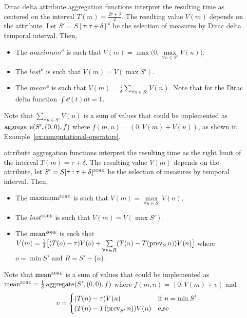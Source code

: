 Dirac delta attribute aggregation functions interpret the resulting
time as centered on the interval $T(m)=\frac{2\tau+\delta}{2}$. The
resulting value $V(m)$ depends on the attribute. Let
$S'=S[\tau:\tau+\delta]^\dd$ be the selection of measures by Dirac
delta temporal interval. Then,
\begin{itemize}
\item The $maximum^\dd$ is such that $V(m) =
  \max\big(0,\max\limits_{\forall n \in S'} V(n)\big)$.
\item The $last^\dd$ is such that $V(m) = V(\max S')$.
\item The $mean^\dd$ is such that $V(m) = \frac{1}{\delta}
  \sum\limits_{\forall n \in S'} V(n)$. Note that for the Dirac
  delta function $\int\dd(t)dt=1$.
\end{itemize}

Note that $\sum\limits_{\forall n \in S'} V(n)$ is a sum of values
that could be implemented as $\operatorname*{aggregate}(S',(0,0),f)$ where
$f(m,n)=(0,V(m)+V(n))$, as shown in
Example~\ref{ex:computational-operators}.

\zohe{} attribute aggregation functions interpret the resulting time
as the right limit of the interval $T(m)=\tau+\delta$. The resulting
value $V(m)$ depends on the attribute, let
$S'=S[\tau:\tau+\delta]^\zohe{}$ be the selection of measures by
\zohe{} temporal interval. Then,

\begin{itemize}

\item The $\maxz$ is such that $V(m) = \max\limits_{\forall n \in S'}
  V(n)$.

\item The $last^\zohe{}$ is such that $V(m) = V(\max S')$.

\item The $\meanz$ is such that $V(m) = \frac{1}{\delta}
  \big[(T(o)-\tau)V(o) + \sum\limits_{\forall n\in R}( T(n)-
  T(\operatorname*{prev}_S n) )V(n)\big]$ where $o=\min S'$ and $R= S' - \{o\}$.

\end{itemize}

Note that $\meanz$ is a sum of values that could be implemented as
$\meanz = \frac{1}{\delta}\agg(S',(0,0),f)$ where $f(m,n)=(0,V(m)+v)$
and
\[
 v=
 \begin{cases}
   (T(n)-\tau)V(n) & \text{if } n=\min S'\\
   (T(n)-T(\operatorname*{prev}_{S'} n))V(n) & \text{else }
 \end{cases}
\]

